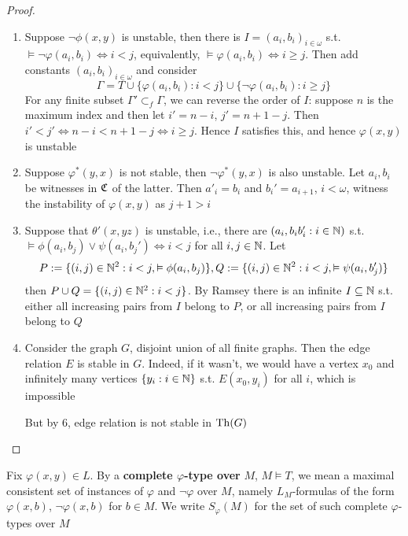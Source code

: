 \documentclass[11pt]{article}
\begin{document}
\begin{proof}
\begin{enumerate}
\item Suppose \(\neg\phi(x,y)\) is unstable, then there is \(I=(a_i,b_i)_{i\in\omega}\)
s.t. \(\vDash\neg\varphi(a_i,b_i)\Leftrightarrow i<j\), equivalently, \(\vDash\varphi(a_i,b_i)\Leftrightarrow i\ge j\).
Then add constants \((a_i,b_i)_{i\in\omega}\) and consider
\begin{equation*}
\Gamma=T\cup\{\varphi(a_i,b_i):i<j\}\cup\{\neg\varphi(a_i,b_i):i\ge j\}
\end{equation*}
For any finite subset \(\Gamma'\subset_f\Gamma\), we can reverse the order of \(I\): suppose \(n\) is the
maximum index and then let \(i'=n-i\), \(j'=n+1-j\). Then \(i'<j'\Leftrightarrow n-i<n+1-j\Leftrightarrow i\ge j\).
Hence \(I\) satisfies this, and hence \(\varphi(x,y)\) is unstable
\item Suppose \(\varphi^*(y,x)\) is not stable, then \(\neg\varphi^*(y,x)\) is also unstable. Let \(a_i,b_i\) be
witnesses in \(\mathfrak{C}\) of the latter. Then \(a'_i=b_i\) and \(b_i'=a_{i+1}\), \(i<\omega\), witness the
instability of \(\varphi(x,y)\) as \(j+1>i\)
\item Suppose that \(\theta'(x,yz)\) is unstable, i.e., there are \((a_i,b_ib_i':i\in\mathbb{N})\)
s.t. \(\vDash\phi(a_i,b_j)\vee\psi(a_i,b_j')\Leftrightarrow i<j\) for all \(i,j\in\mathbb{N}\).
Let
\begin{equation*}
P:=\{(i,j)\in\mathbb{N}^2:i<j,\vDash\phi(a_i,b_j)\},Q:=\{(i,j)\in\mathbb{N}^2:i<j,\vDash\psi(a_i,b_j')\}
\end{equation*}
then \(P\cup Q=\{(i,j)\in\mathbb{N}^2:i<j\}\). By Ramsey there is an infinite \(I\subseteq\mathbb{N}\) s.t. either all
increasing pairs from \(I\) belong to \(P\), or all increasing pairs from \(I\) belong
to \(Q\)
\setcounter{enumi}{6}
\item Consider the graph \(G\), disjoint union of all finite graphs. Then the edge
relation \(E\) is stable in \(G\). Indeed, if it wasn't, we would have a vertex \(x_0\) and
infinitely many vertices \(\{y_i:i\in\mathbb{N}\}\) s.t. \(E(x_0,y_i)\) for all \(i\), which is impossible

But by 6, edge relation is not stable in \(\operatorname{Th}(G)\)
\end{enumerate}
\end{proof}

\begin{definition}[]
Fix \(\varphi(x,y)\in L\). By a \textbf{complete \(\varphi\)-type over} \(M\), \(M\vDash T\), we mean a maximal consistent set
of instances of \(\varphi\) and \(\neg\varphi\) over \(M\), namely \(L_M\)-formulas of the
form \(\varphi(x,b)\), \(\neg\varphi(x,b)\) for \(b\in M\). We write \(S_\varphi(M)\) for the set of such complete
\(\varphi\)-types over \(M\)
\end{definition}
\end{document}
